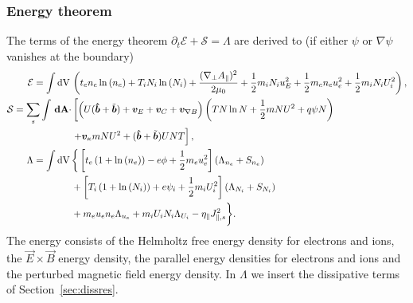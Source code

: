 \subsubsection{Energy theorem}
The terms of the energy theorem $\partial_t \mathcal E + \mathcal S =
\Lambda$ are derived to (if either $\psi$ or $\nabla\psi$ vanishes at the
boundary)
\begin{align} \label{eq:energy_conservation}
  \mathcal{E} = \int  \mathrm{dV}\, & \left( t_e n_e \ln{(n_e)} +T_i N_i\ln{(N_i)}+
  \frac{(\nabla_\perp A_\parallel)^2}{2\mu_0} +  \frac{1}{2} m_i N_i u_E^2
  +\frac{1}{2} m_e  n_e u_e^2 +\frac{1}{2} m_i  N_i U_i^2  \right),\\
  \mathcal S = \sum_s \int {\boldsymbol{\,\mathrm{dA}}} \cdot &\left[ \left(
  U(\bm{\hat{b}}+\tilde{{\boldsymbol{b}}}) + {\boldsymbol{v}}_E + {\boldsymbol{v}}_C + {\boldsymbol{v}}_{\nabla B} \right)
  \left(T N\ln N + \frac{1}{2}m NU^2 + q\psi N \right) \right. \nonumber\\
  & \left . + {\boldsymbol{v}}_\kappa m NU^2  + (\bm{\hat{b}} + \tilde{{\boldsymbol{b}}}) UNT\right], \\
  \Lambda =  \int \mathrm{dV}\, & \bigg\{  \left[t_e\left( 1+\ln{(n_e)}\right) -e \phi + \frac{1}{2} m_e u_e^2 \right](\Lambda_{n_e} + S_{n_e})
  \nonumber\\ &
+\left[T_i\left( 1+\ln{(N_i)}\right) +e \psi_i + \frac{1}{2} m_i U_i^2 \right](\Lambda_{N_i}+S_{N_i})
\nonumber \\ &
+ m_e u_e n_e \Lambda_{u_e}+m_iU_i N_i \Lambda_{U_i} - \eta_\parallel J_{\parallel,s}^2\bigg\}.
\end{align}
The energy consists of the Helmholtz free energy density for electrons and ions, the \(\vec{E} \times \vec{B}\) energy density, the parallel energy densities for electrons and ions and the perturbed magnetic field energy density.
In \(\Lambda\) we insert the dissipative terms of Section~\ref{sec:dissres}. \\
